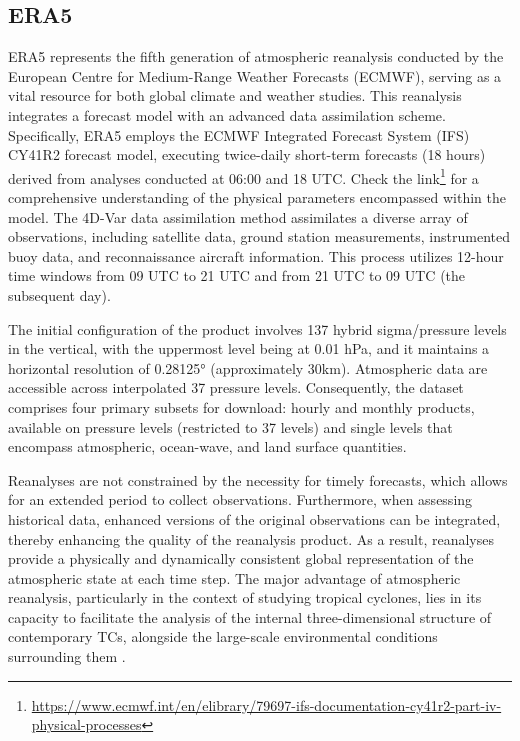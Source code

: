 \subsection{ERA5}

ERA5 \cite{hersbach2020era5} represents the fifth generation of atmospheric reanalysis conducted by the European Centre for Medium-Range Weather Forecasts (ECMWF), serving as a vital resource for both global climate and weather studies. This reanalysis integrates a forecast model with an advanced data assimilation scheme. Specifically, ERA5 employs the ECMWF Integrated Forecast System (IFS) CY41R2 forecast model, executing twice-daily short-term forecasts (18 hours) derived from analyses conducted at 06:00 and 18 UTC. Check the link\footnote{\url{https://www.ecmwf.int/en/elibrary/79697-ifs-documentation-cy41r2-part-iv-physical-processes}} for a comprehensive understanding of the physical parameters encompassed within the model. The 4D-Var data assimilation method assimilates a diverse array of observations, including satellite data, ground station measurements, instrumented buoy data, and reconnaissance aircraft information. This process utilizes 12-hour time windows from 09 UTC to 21 UTC and from 21 UTC to 09 UTC (the subsequent day).

The initial configuration of the product involves 137 hybrid sigma/pressure levels in the vertical, with the uppermost level being at 0.01 hPa, and it maintains a horizontal resolution of 0.28125° (approximately 30km). Atmospheric data are accessible across interpolated 37 pressure levels. Consequently, the dataset comprises four primary subsets for download: hourly and monthly products, available on pressure levels (restricted to 37 levels) and single levels that encompass atmospheric, ocean-wave, and land surface quantities.

Reanalyses are not constrained by the necessity for timely forecasts, which allows for an extended period to collect observations. Furthermore, when assessing historical data, enhanced versions of the original observations can be integrated, thereby enhancing the quality of the reanalysis product. As a result, reanalyses provide a physically and dynamically consistent global representation of the atmospheric state at each time step. The major advantage of atmospheric reanalysis, particularly in the context of studying tropical cyclones, lies in its capacity to facilitate the analysis of the internal three-dimensional structure of contemporary TCs, alongside the large-scale environmental conditions surrounding them \cite{dulac2024assessing}.

